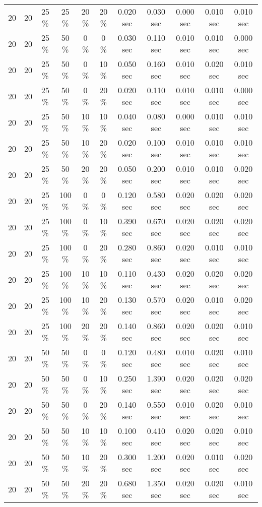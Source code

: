 \documentclass{article}
\begin{document}
\begin{longtable}[]{@{}ccccccccccc@{}}
20 & 20 & 25 \% & 25 \% & 20 \% & 20 \% & 0.020 sec & 0.030 sec & 0.000 sec & 0.010 sec & 0.010 sec \\
20 & 20 & 25 \% & 50 \% & 0 \% & 0 \% & 0.030 sec & 0.110 sec & 0.010 sec & 0.010 sec & 0.000 sec \\
20 & 20 & 25 \% & 50 \% & 0 \% & 10 \% & 0.050 sec & 0.160 sec & 0.010 sec & 0.020 sec & 0.010 sec \\
20 & 20 & 25 \% & 50 \% & 0 \% & 20 \% & 0.020 sec & 0.110 sec & 0.010 sec & 0.010 sec & 0.000 sec \\
20 & 20 & 25 \% & 50 \% & 10 \% & 10 \% & 0.040 sec & 0.080 sec & 0.000 sec & 0.010 sec & 0.010 sec \\
20 & 20 & 25 \% & 50 \% & 10 \% & 20 \% & 0.020 sec & 0.100 sec & 0.010 sec & 0.010 sec & 0.010 sec \\
20 & 20 & 25 \% & 50 \% & 20 \% & 20 \% & 0.050 sec & 0.200 sec & 0.010 sec & 0.010 sec & 0.020 sec \\
20 & 20 & 25 \% & 100 \% & 0 \% & 0 \% & 0.120 sec & 0.580 sec & 0.020 sec & 0.020 sec & 0.020 sec \\
20 & 20 & 25 \% & 100 \% & 0 \% & 10 \% & 0.390 sec & 0.670 sec & 0.020 sec & 0.020 sec & 0.020 sec \\
20 & 20 & 25 \% & 100 \% & 0 \% & 20 \% & 0.280 sec & 0.860 sec & 0.020 sec & 0.010 sec & 0.010 sec \\
20 & 20 & 25 \% & 100 \% & 10 \% & 10 \% & 0.110 sec & 0.430 sec & 0.020 sec & 0.020 sec & 0.020 sec \\
20 & 20 & 25 \% & 100 \% & 10 \% & 20 \% & 0.130 sec & 0.570 sec & 0.020 sec & 0.010 sec & 0.020 sec \\
20 & 20 & 25 \% & 100 \% & 20 \% & 20 \% & 0.140 sec & 0.860 sec & 0.020 sec & 0.020 sec & 0.010 sec \\
20 & 20 & 50 \% & 50 \% & 0 \% & 0 \% & 0.120 sec & 0.480 sec & 0.010 sec & 0.020 sec & 0.010 sec \\
20 & 20 & 50 \% & 50 \% & 0 \% & 10 \% & 0.250 sec & 1.390 sec & 0.020 sec & 0.020 sec & 0.020 sec \\
20 & 20 & 50 \% & 50 \% & 0 \% & 20 \% & 0.140 sec & 0.550 sec & 0.010 sec & 0.020 sec & 0.010 sec \\
20 & 20 & 50 \% & 50 \% & 10 \% & 10 \% & 0.100 sec & 0.410 sec & 0.020 sec & 0.020 sec & 0.010 sec \\
20 & 20 & 50 \% & 50 \% & 10 \% & 20 \% & 0.300 sec & 1.200 sec & 0.020 sec & 0.010 sec & 0.020 sec \\
20 & 20 & 50 \% & 50 \% & 20 \% & 20 \% & 0.680 sec & 1.350 sec & 0.020 sec & 0.020 sec & 0.010 sec \\

\end{longtable}
\end{document}
